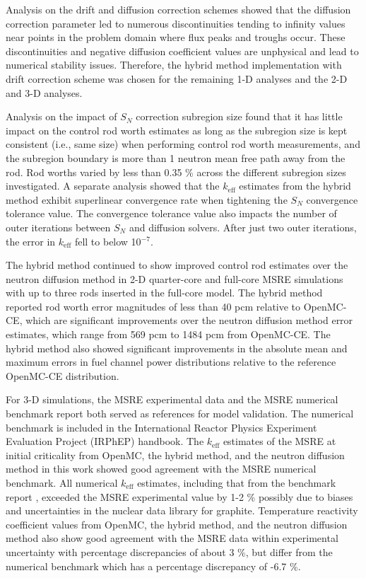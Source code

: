 Analysis on the drift and diffusion correction schemes showed that the diffusion correction
parameter led to numerous discontinuities tending to infinity values near points in the problem
domain where flux peaks and troughs occur. These discontinuities and negative diffusion coefficient
values are unphysical and lead to numerical stability issues. Therefore, the hybrid method
implementation with drift correction scheme was chosen for the remaining 1-D analyses and the
2-D and 3-D analyses.

Analysis on the impact of $S_N$ correction subregion size found that it has little impact on the
control rod worth estimates as long as the subregion size is kept consistent (i.e., same size) when
performing control rod worth measurements, and the subregion boundary is more than 1 neutron mean
free path away from the rod. Rod worths varied by less than 0.35 \% across the
different subregion sizes investigated. A separate analysis showed that the $k_\text{eff}$
estimates from the hybrid method exhibit superlinear convergence rate when tightening the $S_N$
convergence tolerance value. The convergence tolerance value also impacts the number of outer
iterations between $S_N$ and diffusion solvers. After just two outer iterations, the error in
$k_\text{eff}$ fell to below 10$^{-7}$.

The hybrid method continued to show improved control rod estimates over the neutron diffusion
method in 2-D quarter-core and full-core \gls{MSRE} simulations with up to three rods inserted in the
full-core model. The hybrid method reported rod worth error magnitudes of less than 40 pcm relative
to OpenMC-CE, which are significant improvements over the neutron diffusion method error estimates,
which range from 569 pcm to 1484 pcm from OpenMC-CE. The hybrid method also showed significant
improvements in the absolute mean and maximum errors in fuel channel power distributions relative
to the reference OpenMC-CE distribution.

For 3-D simulations, the \gls{MSRE} experimental data and the \gls{MSRE} numerical benchmark
report \cite{fratoni_molten_2020} both served as references for model validation. The numerical
benchmark is included in the International Reactor Physics Experiment Evaluation Project (IRPhEP)
handbook. The
$k_\text{eff}$ estimates of the \gls{MSRE} at initial criticality from OpenMC, the hybrid method,
and the neutron diffusion method in this work showed good agreement with the \gls{MSRE} numerical
benchmark. All numerical $k_\text{eff}$ estimates, including that from the benchmark report
\cite{fratoni_molten_2020}, exceeded the \gls{MSRE} experimental value by 1-2 \% possibly due to
biases and uncertainties in the nuclear data library for graphite. Temperature reactivity
coefficient values from OpenMC, the hybrid method, and the neutron diffusion method also show good
agreement with the \gls{MSRE} data within experimental uncertainty with percentage discrepancies of
about 3 \%, but differ from the numerical benchmark which has a percentage discrepancy of -6.7 \%.

